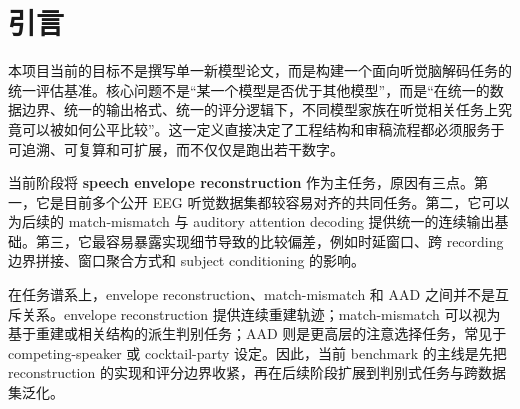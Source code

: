 \section{引言}

本项目当前的目标不是撰写单一新模型论文，而是构建一个面向听觉脑解码任务的统一评估基准。核心问题不是“某一个模型是否优于其他模型”，而是“在统一的数据边界、统一的输出格式、统一的评分逻辑下，不同模型家族在听觉相关任务上究竟可以被如何公平比较”。这一定义直接决定了工程结构和审稿流程都必须服务于可追溯、可复算和可扩展，而不仅仅是跑出若干数字。

当前阶段将 \textbf{speech envelope reconstruction} 作为主任务，原因有三点。第一，它是目前多个公开 EEG 听觉数据集都较容易对齐的共同任务。第二，它可以为后续的 match-mismatch 与 auditory attention decoding 提供统一的连续输出基础。第三，它最容易暴露实现细节导致的比较偏差，例如时延窗口、跨 recording 边界拼接、窗口聚合方式和 subject conditioning 的影响。

在任务谱系上，envelope reconstruction、match-mismatch 和 AAD 之间并不是互斥关系。envelope reconstruction 提供连续重建轨迹；match-mismatch 可以视为基于重建或相关结构的派生判别任务；AAD 则是更高层的注意选择任务，常见于 competing-speaker 或 cocktail-party 设定。因此，当前 benchmark 的主线是先把 reconstruction 的实现和评分边界收紧，再在后续阶段扩展到判别式任务与跨数据集泛化。
